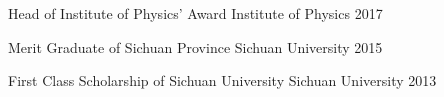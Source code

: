 
\begin{cvhonors}

  \cvhonor
    {Head of Institute of Physics' Award} %
    {} %
    {Institute of Physics} %
    {2017} %

  \cvhonor
    {Merit Graduate of Sichuan Province} %
    {} %
    {Sichuan University} %
    {2015} %

  \cvhonor
    {First Class Scholarship of Sichuan University} %
    {} %
    {Sichuan University} %
    {2013} %


\end{cvhonors}

